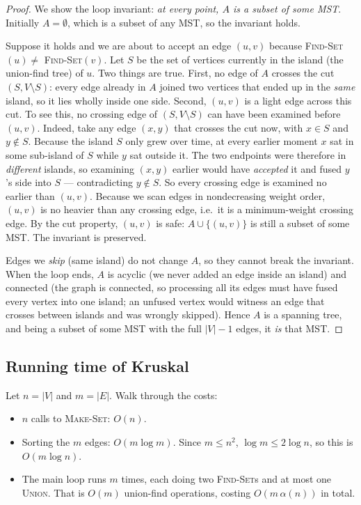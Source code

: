 \begin{proof}
We show the loop invariant: \emph{at every point, $A$ is a subset of some MST}.
Initially $A = \emptyset$, which is a subset of any MST, so the invariant holds.

Suppose it holds and we are about to accept an edge $(u,v)$ because
\textsc{Find-Set}$(u) \ne$ \textsc{Find-Set}$(v)$. Let $S$ be the set of vertices
currently in the island (the union-find tree) of $u$. Two things are true. First,
no edge of $A$ crosses the cut $(S, V\setminus S)$: every edge already in $A$
joined two vertices that ended up in the \emph{same} island, so it lies wholly
inside one side. Second, $(u,v)$ is a light edge across this cut. To see this,
no crossing edge of $(S, V\setminus S)$ can have been examined before
$(u,v)$. Indeed, take any edge $(x,y)$ that crosses the cut now, with $x \in S$
and $y \notin S$. Because the island $S$ only grew over time, at every earlier
moment $x$ sat in some sub-island of $S$ while $y$ sat outside it. The two
endpoints were therefore in \emph{different} islands, so examining $(x,y)$
earlier would have \emph{accepted} it and fused $y$'s side into $S$ ---
contradicting $y \notin S$. So every crossing edge is examined no earlier than
$(u,v)$. Because we scan edges in nondecreasing weight order, $(u,v)$ is no
heavier than any crossing edge, i.e.\ it is a minimum-weight crossing edge. By
the cut property,
$(u,v)$ is safe: $A \cup \{(u,v)\}$ is still a subset of some MST. The invariant
is preserved.

Edges we \emph{skip} (same island) do not change $A$, so they cannot break the
invariant. When the loop ends, $A$ is acyclic (we never added an edge inside an
island) and connected (the graph is connected, so processing all its edges must
have fused every vertex into one island; an unfused vertex would witness an edge
that crosses between islands and was wrongly skipped). Hence $A$ is a spanning
tree, and being a subset of some MST with the full $|V|-1$ edges, it \emph{is}
that MST.
\end{proof}

\subsection{Running time of Kruskal}

Let $n = |V|$ and $m = |E|$. Walk through the costs:

\begin{itemize}
\item $n$ calls to \textsc{Make-Set}: $O(n)$.
\item Sorting the $m$ edges: $O(m \log m)$. Since $m \le n^2$, $\log m \le 2\log n$,
  so this is $O(m \log n)$.
\item The main loop runs $m$ times, each doing two \textsc{Find-Set}s and at most
  one \textsc{Union}. That is $O(m)$ union-find operations, costing
  $O(m\,\alpha(n))$ in total.
\end{itemize}

